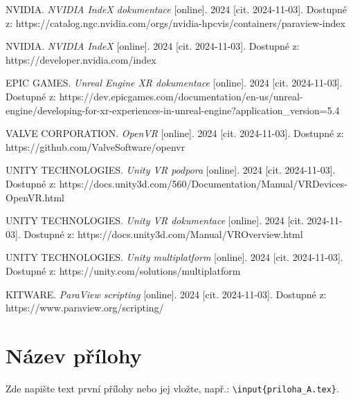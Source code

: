 \documentclass[a4paper,oneside,12pt]{book}
\begin{document}
\begin{thebibliography}{99}
NVIDIA. \textit{NVIDIA IndeX dokumentace} [online]. 2024 [cit. 2024-11-03]. Dostupné z: https://catalog.ngc.nvidia.com/orgs/nvidia-hpcvis/containers/paraview-index

NVIDIA. \textit{NVIDIA IndeX} [online]. 2024 [cit. 2024-11-03]. Dostupné z: https://developer.nvidia.com/index

EPIC GAMES. \textit{Unreal Engine XR dokumentace} [online]. 2024 [cit. 2024-11-03]. Dostupné z: https://dev.epicgames.com/documentation/en-us/unreal-engine/developing-for-xr-experiences-in-unreal-engine?application\_version=5.4

VALVE CORPORATION. \textit{OpenVR} [online]. 2024 [cit. 2024-11-03]. Dostupné z: https://github.com/ValveSoftware/openvr


UNITY TECHNOLOGIES. \textit{Unity VR podpora} [online]. 2024 [cit. 2024-11-03]. Dostupné z: https://docs.unity3d.com/560/Documentation/Manual/VRDevices-OpenVR.html


UNITY TECHNOLOGIES. \textit{Unity VR dokumentace} [online]. 2024 [cit. 2024-11-03]. Dostupné z: https://docs.unity3d.com/Manual/VROverview.html

UNITY TECHNOLOGIES. \textit{Unity multiplatform} [online]. 2024 [cit. 2024-11-03]. Dostupné z: https://unity.com/solutions/multiplatform

KITWARE. \textit{ParaView scripting} [online]. 2024 [cit. 2024-11-03]. Dostupné z: https://www.paraview.org/scripting/
\end{thebibliography}


\newpage %
\appendix %


\chapter{Název přílohy} %
Zde napište text první přílohy nebo jej vložte, např.: \texttt{\textbackslash input\{priloha\_A.tex\}}.
%
\end{document}
